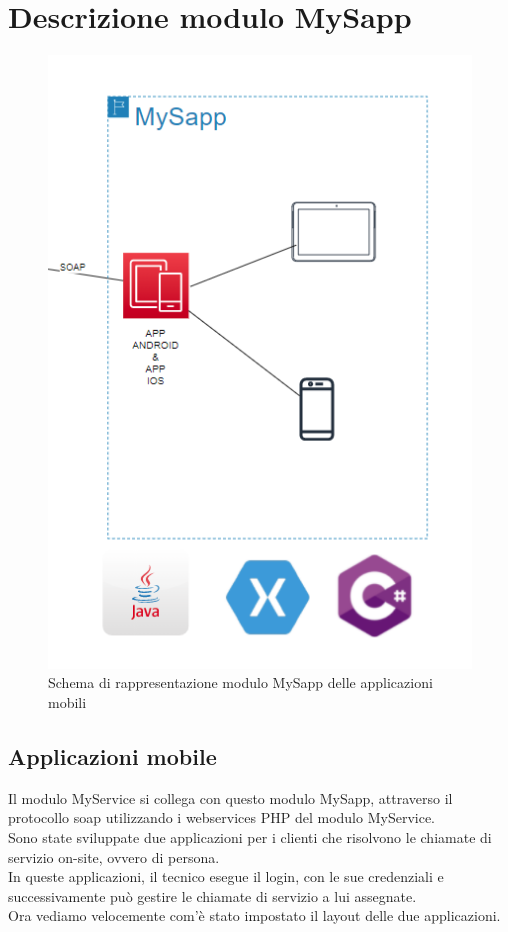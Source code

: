 \section{Descrizione modulo MySapp}
\begin{figure}[!h] 
	\centering 
	\includegraphics[scale = 1.1]{immagini/modulo-mysapp.png} 
	\caption{Schema di rappresentazione modulo MySapp delle applicazioni mobili}
\end{figure}
\newpage
\subsection{Applicazioni mobile}
Il modulo MyService si collega con questo modulo MySapp, attraverso il protocollo \gls{soap} utilizzando i webservices PHP del modulo MyService.\\
Sono state sviluppate due applicazioni per i clienti che risolvono le chiamate di servizio on-site, ovvero di persona.\\
In queste applicazioni, il tecnico esegue il login, con le sue credenziali e successivamente può gestire le chiamate di servizio a lui assegnate.\\
Ora vediamo velocemente com'è stato impostato il layout delle due applicazioni.
